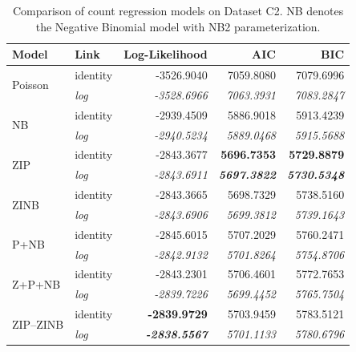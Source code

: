 \begin{table}[!h]
\caption{Comparison of count regression models on Dataset C2. NB denotes the Negative Binomial model with NB2 parameterization.}
\centering
\begin{tabular}{llrrr}
\toprule
Model & Link & Log-Likelihood & AIC & BIC \\
\midrule
\multirow[t]{2}{*}{Poisson} & identity & -3526.9040 & 7059.8080 & 7079.6996 \\
 & \textit{log} & \textit{-3528.6966} & \textit{7063.3931} & \textit{7083.2847} \\

\multirow[t]{2}{*}{NB} & identity & -2939.4509 & 5886.9018 & 5913.4239 \\
 & \textit{log} & \textit{-2940.5234} & \textit{5889.0468} & \textit{5915.5688} \\

\multirow[t]{2}{*}{ZIP} & identity & -2843.3677 & \textbf{5696.7353} & \textbf{5729.8879} \\
 & \textit{log} & \textit{-2843.6911} & \textbf{\textit{5697.3822}} & \textbf{\textit{5730.5348}} \\

\multirow[t]{2}{*}{ZINB} & identity & -2843.3665 & 5698.7329 & 5738.5160 \\
 & \textit{log} & \textit{-2843.6906} & \textit{5699.3812} & \textit{5739.1643} \\

\multirow[t]{2}{*}{P+NB} & identity & -2845.6015 & 5707.2029 & 5760.2471 \\
 & \textit{log} & \textit{-2842.9132} & \textit{5701.8264} & \textit{5754.8706} \\

\multirow[t]{2}{*}{Z+P+NB} & identity & -2843.2301 & 5706.4601 & 5772.7653 \\
 & \textit{log} & \textit{-2839.7226} & \textit{5699.4452} & \textit{5765.7504} \\

\multirow[t]{2}{*}{ZIP--ZINB} & identity & \textbf{-2839.9729} & 5703.9459 & 5783.5121 \\
 & \textit{log} & \textbf{\textit{-2838.5567}} & \textit{5701.1133} & \textit{5780.6796} \\

\bottomrule
\end{tabular}
\label{tab:C2}
\end{table}
